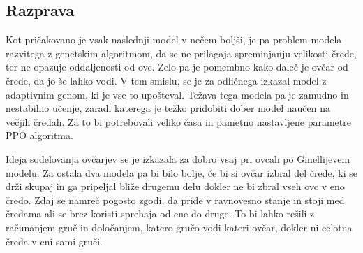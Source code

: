 \subsection{Razprava}

Kot pričakovano je vsak naslednji model v nečem boljši, je pa problem modela razvitega z genetskim algoritmom, da se ne prilagaja spreminjanju velikosti črede, ter ne opazuje oddaljenosti od ovc. Zelo pa je pomembno kako daleč je ovčar od črede, da jo še lahko vodi. V tem smislu, se je za odličnega izkazal model z adaptivnim genom, ki je vse to upošteval. Težava tega modela pa je zamudno in nestabilno učenje, zaradi katerega je težko pridobiti dober model naučen na večjih čredah. Za to bi potrebovali veliko časa in pametno nastavljene parametre PPO algoritma.

Ideja sodelovanja ovčarjev se je izkazala za dobro vsaj pri ovcah po Ginellijevem modelu. Za ostala dva modela pa bi bilo bolje, če bi si ovčar izbral del črede, ki se drži skupaj in ga pripeljal bliže drugemu delu dokler ne bi zbral vseh ovc v eno čredo. Zdaj se namreč pogosto zgodi, da pride v ravnovesno stanje in stoji med čredama ali se brez koristi sprehaja od ene do druge. To bi lahko rešili z računanjem gruč in določanjem, katero gručo vodi kateri ovčar, dokler ni celotna čreda v eni sami gruči.

